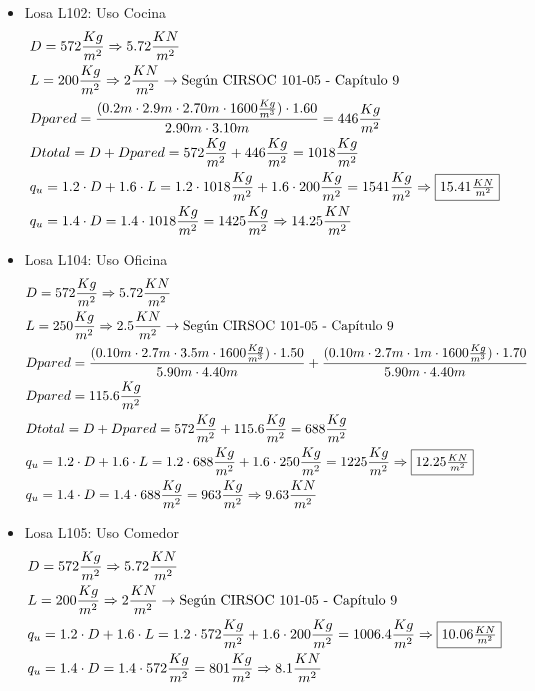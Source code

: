 \begin{enumerate}
\begin{itemize}
\item Losa L102: Uso Cocina
\begin{align*}
& D = 572 \frac{Kg}{m^2} \Rightarrow 5.72 \frac{KN}{m^2} \\
& L = 200 \frac{Kg}{m^2} \Rightarrow 2 \frac{KN}{m^2} \rightarrow \text{Según CIRSOC 101-05 - Capítulo 9}\\
& Dpared = \frac{(0.2m \cdot 2.9m \cdot 2.70m \cdot 1600 \frac{Kg}{m^3}) \cdot 1.60}{2.90m \cdot 3.10m} = 446 \frac{Kg}{m^2} \\
& Dtotal = D + Dpared = 572 \frac{Kg}{m^2} + 446 \frac{Kg}{m^2} = 1018 \frac{Kg}{m^2} \\
& q_u = 1.2 \cdot D + 1.6 \cdot L = 1.2 \cdot 1018 \frac{Kg}{m^2} + 1.6 \cdot 200 \frac{Kg}{m^2} = 1541 \frac{Kg}{m^2} \Rightarrow \framebox{$15.41 \frac{KN}{m^2}$} \\
& q_u = 1.4 \cdot D = 1.4 \cdot 1018 \frac{Kg}{m^2} = 1425 \frac{Kg}{m^2} \Rightarrow 14.25 \frac{KN}{m^2}
\end{align*}

\item Losa L104: Uso Oficina
\begin{align*}
& D = 572 \frac{Kg}{m^2} \Rightarrow 5.72 \frac{KN}{m^2} \\
& L = 250 \frac{Kg}{m^2} \Rightarrow 2.5 \frac{KN}{m^2} \rightarrow \text{Según CIRSOC 101-05 - Capítulo 9}\\
& Dpared = \frac{(0.10m \cdot 2.7m \cdot 3.5m \cdot 1600 \frac{Kg}{m^3}) \cdot 1.50}{5.90m \cdot 4.40m} + \frac{(0.10m \cdot 2.7m \cdot 1m \cdot 1600 \frac{Kg}{m^3}) \cdot 1.70}{5.90m \cdot 4.40m}\\
& Dpared = 115.6 \frac{Kg}{m^2} \\
& Dtotal = D + Dpared = 572 \frac{Kg}{m^2} + 115.6 \frac{Kg}{m^2} = 688 \frac{Kg}{m^2} \\
& q_u = 1.2 \cdot D + 1.6 \cdot L = 1.2 \cdot 688 \frac{Kg}{m^2} + 1.6 \cdot 250 \frac{Kg}{m^2} = 1225 \frac{Kg}{m^2} \Rightarrow \framebox{$12.25 \frac{KN}{m^2}$} \\
& q_u = 1.4 \cdot D = 1.4 \cdot 688 \frac{Kg}{m^2} = 963 \frac{Kg}{m^2} \Rightarrow 9.63 \frac{KN}{m^2}
\end{align*}

\item Losa L105: Uso Comedor
\begin{align*}
& D = 572 \frac{Kg}{m^2} \Rightarrow 5.72 \frac{KN}{m^2} \\
& L = 200 \frac{Kg}{m^2} \Rightarrow 2 \frac{KN}{m^2} \rightarrow \text{Según CIRSOC 101-05 - Capítulo 9}\\
& q_u = 1.2 \cdot D + 1.6 \cdot L = 1.2 \cdot 572 \frac{Kg}{m^2} + 1.6 \cdot 200 \frac{Kg}{m^2} = 1006.4 \frac{Kg}{m^2} \Rightarrow \framebox{$10.06 \frac{KN}{m^2}$} \\
& q_u = 1.4 \cdot D = 1.4 \cdot 572 \frac{Kg}{m^2} = 801 \frac{Kg}{m^2} \Rightarrow 8.1 \frac{KN}{m^2}
\end{align*}


\end{itemize}
\end{enumerate}
